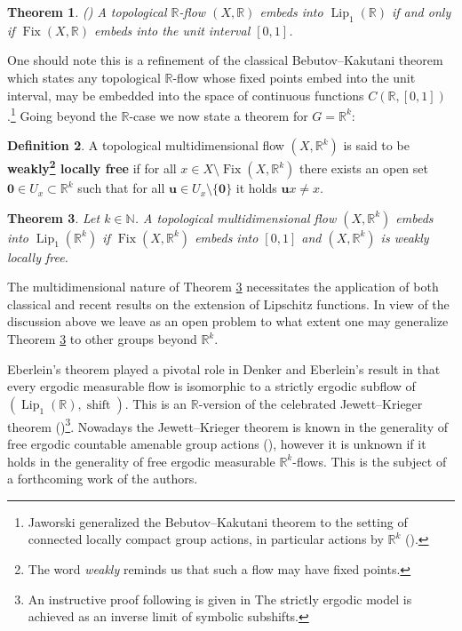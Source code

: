 \documentclass[11pt]{article}
\theoremstyle{plain}
\newtheorem{thm}{Theorem}[section]
\theoremstyle{definition}
\newtheorem{defn}[thm]{Definition}
\DeclareMathOperator{\Lip}{Lip}
\DeclareMathOperator{\Fix}{Fix}
\DeclareMathOperator{\shift}{shift}
\def\R{\mathbb{R}}
\def\Rk{\mathbb{R}^k}
\def\N{\mathbb{N}}
\def\uu{\mathbf u}
\numberwithin{figure}{section}
\begin{document}
\begin{thm}\label{GJT}(\cite[Theorem 1.3]{GJT19}) A topological $\mathbb{R}$-flow $(X,\R)$ embeds into $\Lip_{1}(\mathbb{R})$ if and only if $\Fix(X,\R)$ embeds into the unit interval $[0,1]$.
\end{thm}
\noindent
One should note this is a  refinement of the classical Bebutov--Kakutani theorem \cite{Beb40, Kak68}  which states any topological $\mathbb{R}$-flow whose fixed points embed into the unit interval, may be embedded into the space of continuous functions $C(\mathbb{R}, [0,1])$.\footnote{Jaworski generalized the Bebutov--Kakutani theorem to the setting of connected locally compact group actions, in particular actions by $\Rk$ (\cite[Corollary III.1.1]{Jawo74}).} Going beyond the $\R$-case we now state a theorem for $G=\R^k$: 

\begin{defn}\label{def:LFOF}
 A topological  multidimensional flow $(X,\mathbb{R}^k)$ is said to be \textbf{weakly\footnote{The word \textit{weakly} reminds us that such a flow may have fixed points.} locally free}  if for all $x\in X\setminus\Fix(X,\mathbb{R}^k)$ there exists an open set $\mathbf{0}\in U_x\subset \mathbb{R}^k$ such that for all $\mathbf u\in U_x\setminus \{\mathbf{0}\}$ it holds $\uu x\neq x$. 
\end{defn}
\begin{thm}\label{RkGJT}
   Let $k\in \N$. A topological multidimensional flow $(X,\mathbb{R}^k)$ embeds into $\Lip_{1}(\mathbb{R}^k)$ if $\Fix(X,\R^k)$ embeds into $[0,1]$ and $(X,\mathbb{R}^k)$ is weakly locally free.
 \end{thm}
The multidimensional nature of Theorem \ref{RkGJT}  necessitates the application of both classical and recent results on the extension of Lipschitz functions. In view of the discussion above we leave as an open problem to what extent one may generalize Theorem \ref{RkGJT} to other groups beyond $\Rk$.

Eberlein's theorem  played a pivotal role in Denker and Eberlein's result in \cite{DE74} that every ergodic measurable flow is isomorphic to a strictly ergodic subflow of $(\Lip_{1}(\mathbb{R}),\shift)$. This is an $\R$-version of the celebrated Jewett--Krieger theorem (\cite{Jew69, Kri72})\footnote{An instructive proof following \cite{w85}  is given in \cite[\S15.8]{G03} The strictly ergodic model is achieved as an inverse limit of symbolic subshifts.}. Nowadays the  Jewett--Krieger theorem is known in the generality of free ergodic countable amenable group actions (\cite{w85, Ros85,Wei25}), however it is unknown if it holds in the generality of  free ergodic measurable $\Rk$-flows. This is the subject of a forthcoming work of the authors. 
\end{document}
